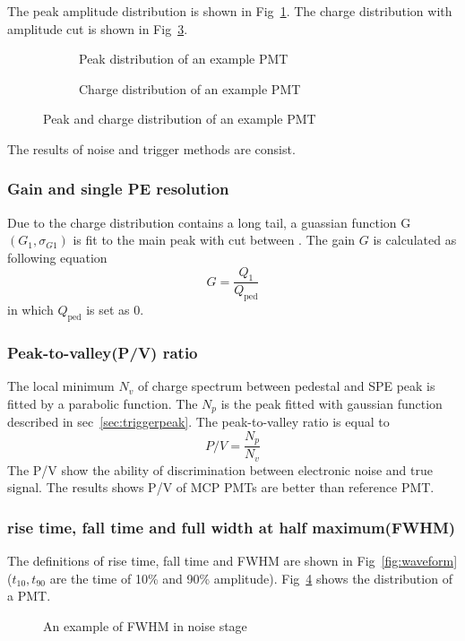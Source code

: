 The peak amplitude distribution is shown in Fig~\ref{fig:triggerpeak}. The charge distribution with amplitude cut is shown in Fig~\ref{fig:triggercharge}.
\begin{figure}[!htbp]
    \centering
    \begin{subfigure}[b]{0.35\textwidth}
        \caption{Peak distribution of an example PMT}%
        \label{fig:triggerpeak}
    \end{subfigure}
    \begin{subfigure}[b]{0.35\textwidth}
        \caption{Charge distribution of an example PMT}%
        \label{fig:triggercharge}
    \end{subfigure}
    \caption{Peak and charge distribution of an example PMT}
\end{figure}
The results of noise and trigger methods are consist.
\subsubsection{Gain and single PE resolution}
Due to the charge distribution contains a long tail, a guassian function G$(G_1,\sigma_{G1})$ is fit to the main peak with cut between . The gain $G$ is calculated as following equation
\begin{equation}
    G=\frac{Q_1}{Q_{\mathrm{ped}}}
\end{equation}
in which $Q_{\mathrm{ped}}$ is set as 0.
\subsubsection{Peak-to-valley(P/V) ratio}
The local minimum $N_v$ of charge spectrum between pedestal and SPE peak is fitted by a parabolic function. The $N_p$ is the peak fitted with gaussian function described in sec~\ref{sec:triggerpeak}.
The peak-to-valley ratio is equal to  
\begin{equation}
    P/V=\frac{N_p}{N_v}
\end{equation}
The P/V show the ability of discrimination between electronic noise and true signal. The results shows P/V of MCP PMTs are better than reference PMT.
\subsubsection{rise time, fall time and full width at half maximum(FWHM)}
The definitions of rise time, fall time and FWHM are shown in Fig~\ref{fig:waveform}($t_{10}, t_{90}$ are the time of 10\% and 90\% amplitude). Fig~\ref{fig:FWHM} shows the distribution of a PMT.
\begin{figure}
    \caption{An example of FWHM in noise stage}
    \label{fig:FWHM}
\end{figure}
